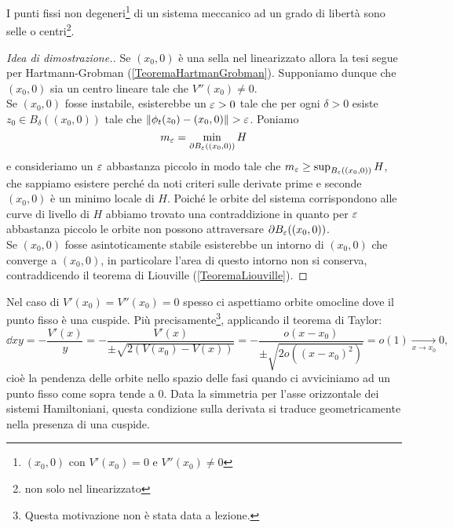 \begin{proposition}\label{CaratterizzazionePuntiFissiSistemaMeccanico1GradoLiberta}
I punti fissi non degeneri\footnote{$(x_0,0)$ con $V'(x_0)=0$ e $V''(x_0)\neq 0$} di un sistema meccanico ad un grado di libert\`a sono selle o centri\footnote{non solo nel linearizzato}.
\end{proposition}
\begin{proof}[Idea di dimostrazione.]
Se $(x_0,0)$ \`e una sella nel linearizzato allora la tesi segue per Hartmann-Grobman (\ref{TeoremaHartmanGrobman}). Supponiamo dunque che $(x_0,0)$ sia un centro lineare tale che $V''(x_0)\neq 0$.\\
Se $(x_0,0)$ fosse instabile, esisterebbe un $\varepsilon>0$ tale che per ogni $\delta>0$ esiste $z_0\in B_\delta((x_0,0))$ tale che $\left\Vert{\phi_t(z_0)-(x_0,0)}\right\Vert>\varepsilon$. Poniamo
\[m_\varepsilon=\min_{\partial{B_\varepsilon((x_0,0))}} H\]
e consideriamo un $\varepsilon$ abbastanza piccolo in modo tale che $m_\varepsilon\geq \sup_{B_\varepsilon((x_0,0))} H$, che sappiamo esistere perch\'e da noti criteri sulle derivate prime e seconde $(x_0,0)$ \`e un minimo locale di $H$.
Poich\'e le orbite del sistema corrispondono alle curve di livello di $H$ abbiamo trovato una contraddizione in quanto per $\varepsilon$ abbastanza piccolo le orbite non possono attraversare $\partial B_\varepsilon((x_0,0))$.\\
Se $(x_0,0)$ fosse asintoticamente stabile esisterebbe un intorno di $(x_0,0)$ che converge a $(x_0,0)$, in particolare l'area di questo intorno non si conserva, contraddicendo il teorema di Liouville (\ref{TeoremaLiouville}).
\end{proof}
\medskip

\noindent
Nel caso di $V'(x_0)=V''(x_0)=0$ spesso ci aspettiamo orbite omocline dove il punto fisso \`e una cuspide. Pi\`u precisamente\footnote{Questa motivazione non \`e stata data a lezione.}, applicando il teorema di Taylor:
\[\dd xy=-\frac{V'(x)}{y}=-\frac{V'(x)}{\pm \sqrt{2(V(x_0)-V(x))}}=-\frac{o(x-x_0)}{\pm\sqrt{2o((x-x_0)^2)}}=o(1)\underset{x\to x_0}{\longrightarrow}0,\]
cio\`e la pendenza delle orbite nello spazio delle fasi quando ci avviciniamo ad un punto fisso come sopra tende a $0$. Data la simmetria per l'asse orizzontale dei sistemi Hamiltoniani, questa condizione sulla derivata si traduce geometricamente nella presenza di una cuspide.